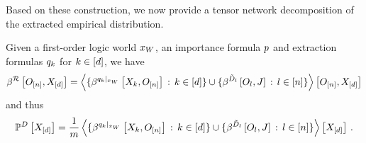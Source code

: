 Based on these construction, we now provide a tensor network decomposition of the extracted empirical distribution.

\begin{theorem}
    Given a first-order logic world $x_{W}$, an importance formula $p$ and extraction formulas $q_{k}$ for $k\in[d]$, we have
    \begin{align*}
        \beta^{\mathcal{R}}\left[O_{[n]},X_{[d]}\right] =
        \left\langle 
            \{\beta^{{q_{k}}|_{x_{W}}}\left[X_{k},O_{[n]}\right] \, : \, k\in[d]\}
            \cup \{\beta^{\tilde{D}_{l}}\left[O_{l},J\right] \, : \, l\in[n]\}
        \right\rangle \left[ O_{[n]},X_{[d]} \right]
    \end{align*}
    and thus
    \begin{align*}
        \mathbb{P}^{D}\left[X_{[d]}\right] =
        \frac{1}{m}  \left\langle 
            \{\beta^{{q_{k}}|_{x_{W}}}\left[X_{k},O_{[n]}\right] \, : \, k\in[d]\}
            \cup \{\beta^{\tilde{D}_{l}}\left[O_{l},J\right] \, : \, l\in[n]\}
        \right\rangle \left[ X_{[d]} \right] \, .
    \end{align*}
\end{theorem}
